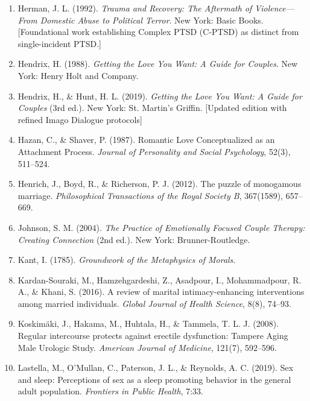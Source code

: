\documentclass[12pt, letterpaper]{article}
\begin{document}
\begin{enumerate}
    \item Herman, J. L. (1992). \textit{Trauma and Recovery: The Aftermath of Violence---From Domestic Abuse to Political Terror}. New York: Basic Books. [Foundational work establishing Complex PTSD (C-PTSD) as distinct from single-incident PTSD.]
    
    \item Hendrix, H. (1988). \textit{Getting the Love You Want: A Guide for Couples}. New York: Henry Holt and Company.
    
    \item Hendrix, H., \& Hunt, H. L. (2019). \textit{Getting the Love You Want: A Guide for Couples} (3rd ed.). New York: St. Martin's Griffin. [Updated edition with refined Imago Dialogue protocols]
    
    \item Hazan, C., \& Shaver, P. (1987). Romantic Love Conceptualized as an Attachment Process. \textit{Journal of Personality and Social Psychology}, 52(3), 511--524.
    
    \item Henrich, J., Boyd, R., \& Richerson, P. J. (2012). The puzzle of monogamous marriage. \textit{Philosophical Transactions of the Royal Society B}, 367(1589), 657--669.
    
    \item Johnson, S. M. (2004). \textit{The Practice of Emotionally Focused Couple Therapy: Creating Connection} (2nd ed.). New York: Brunner-Routledge.
    
    \item Kant, I. (1785). \textit{Groundwork of the Metaphysics of Morals}.
    
    \item Kardan-Souraki, M., Hamzehgardeshi, Z., Asadpour, I., Mohammadpour, R. A., \& Khani, S. (2016). A review of marital intimacy-enhancing interventions among married individuals. \textit{Global Journal of Health Science}, 8(8), 74--93.
    
    \item Koskimäki, J., Hakama, M., Huhtala, H., \& Tammela, T. L. J. (2008). Regular intercourse protects against erectile dysfunction: Tampere Aging Male Urologic Study. \textit{American Journal of Medicine}, 121(7), 592--596.
    
    \item Lastella, M., O'Mullan, C., Paterson, J. L., \& Reynolds, A. C. (2019). Sex and sleep: Perceptions of sex as a sleep promoting behavior in the general adult population. \textit{Frontiers in Public Health}, 7:33.
    

\end{enumerate}
\end{document}
